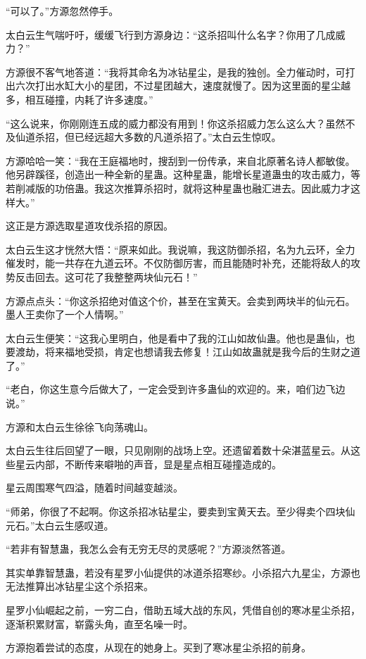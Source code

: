 \begin{this_body}
“可以了。”方源忽然停手。

太白云生气喘吁吁，缓缓飞行到方源身边：“这杀招叫什么名字？你用了几成威力？”

方源很不客气地答道：“我将其命名为冰钻星尘，是我的独创。全力催动时，可打出六次打出水缸大小的星团，不过星团越大，速度就慢了。因为这里面的星尘越多，相互碰撞，内耗了许多速度。”

“这么说来，你刚刚连五成的威力都没有用到！你这杀招威力怎么这么大？虽然不及仙道杀招，但已经远超大多数的凡道杀招了。”太白云生惊叹。

方源哈哈一笑：“我在王庭福地时，搜刮到一份传承，来自北原著名诗人都敏俊。他另辟蹊径，创造出一种全新的星蛊。这种星蛊，能增长星道蛊虫的攻击威力，等若削减版的功倍蛊。我这次推算杀招时，就将这种星蛊也融汇进去。因此威力才这样大。”

这正是方源选取星道攻伐杀招的原因。

太白云生这才恍然大悟：“原来如此。我说嘛，我这防御杀招，名为九云环，全力催发时，能一共存在九道云环。不仅防御厉害，而且能随时补充，还能将敌人的攻势反击回去。这可花了我整整两块仙元石！”

方源点点头：“你这杀招绝对值这个价，甚至在宝黄天。会卖到两块半的仙元石。墨人王卖你了一个人情啊。”

太白云生便笑：“这我心里明白，他是看中了我的江山如故仙蛊。他也是蛊仙，也要渡劫，将来福地受损，肯定也想请我去修复！江山如故蛊就是我今后的生财之道了。”

“老白，你这生意今后做大了，一定会受到许多蛊仙的欢迎的。来，咱们边飞边说。”

方源和太白云生徐徐飞向荡魂山。

太白云生往后回望了一眼，只见刚刚的战场上空。还遗留着数十朵湛蓝星云。从这些星云内部，不断传来噼啪的声音，显是星点相互碰撞造成的。

星云周围寒气四溢，随着时间越变越淡。

“师弟，你很了不起啊。你这杀招冰钻星尘，要卖到宝黄天去。至少得卖个四块仙元石。”太白云生感叹道。

“若非有智慧蛊，我怎么会有无穷无尽的灵感呢？”方源淡然答道。

其实单靠智慧蛊，若没有星罗小仙提供的冰道杀招寒纱。小杀招六九星尘，方源也无法推算出冰钻星尘这个杀招来。

星罗小仙崛起之前，一穷二白，借助五域大战的东风，凭借自创的寒冰星尘杀招，逐渐积累财富，崭露头角，直至名噪一时。

方源抱着尝试的态度，从现在的她身上。买到了寒冰星尘杀招的前身。


\end{this_body}
